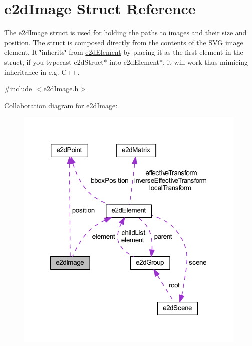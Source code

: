 \hypertarget{structe2d_image}{\section{e2d\-Image Struct Reference}
\label{structe2d_image}
}


The \hyperlink{structe2d_image}{e2d\-Image} struct is used for holding the paths to images and their size and position. The struct is composed directly from the contents of the S\-V\-G image element. It \char`\"{}inherits\char`\"{} from \hyperlink{structe2d_element}{e2d\-Element} by placing it as the first element in the struct, if you typecast e2d\-Struct$\ast$ into e2d\-Element$\ast$, it will work thus mimicing inheritance in e.\-g. C++.  




{\ttfamily \#include $<$e2d\-Image.\-h$>$}



Collaboration diagram for e2d\-Image\-:\nopagebreak
\begin{figure}[H]
\begin{center}
\leavevmode
\includegraphics[width=314pt]{structe2d_image__coll__graph}
\end{center}
\end{figure}

